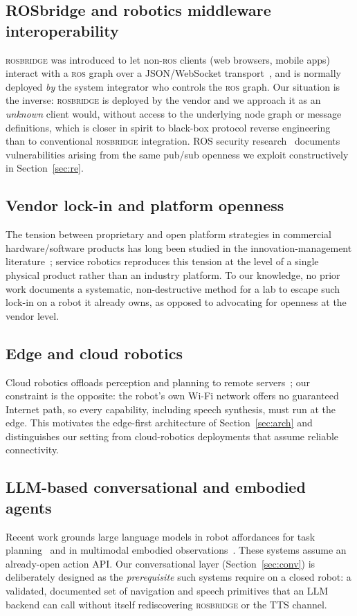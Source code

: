\documentclass[conference]{IEEEtran}
\newcommand{\ros}{\textsc{ros}}
\newcommand{\rosbridge}{\textsc{rosbridge}}
\begin{document}
\subsection{ROSbridge and robotics middleware interoperability}
\rosbridge{} was introduced to let non-\ros{} clients (web browsers, mobile apps) interact with a \ros{} graph over a JSON/WebSocket transport~\cite{crick2012rosbridge,rosbridge_suite}, and is normally deployed \emph{by} the system integrator who controls the \ros{} graph.
Our situation is the inverse: \rosbridge{} is deployed by the vendor and we approach it as an \emph{unknown} client would, without access to the underlying node graph or message definitions, which is closer in spirit to black-box protocol reverse engineering~\cite{comparetti2009prospex} than to conventional \rosbridge{} integration.
ROS security research~\cite{dieber2017security} documents vulnerabilities arising from the same pub/sub openness we exploit constructively in Section~\ref{sec:re}.

\subsection{Vendor lock-in and platform openness}
The tension between proprietary and open platform strategies in commercial hardware/software products has long been studied in the innovation-management literature~\cite{west2003open}; service robotics reproduces this tension at the level of a single physical product rather than an industry platform.
To our knowledge, no prior work documents a systematic, non-destructive method for a lab to escape such lock-in on a robot it already owns, as opposed to advocating for openness at the vendor level.

\subsection{Edge and cloud robotics}
Cloud robotics offloads perception and planning to remote servers~\cite{kehoe2015cloud}; our constraint is the opposite: the robot's own Wi-Fi network offers no guaranteed Internet path, so every capability, including speech synthesis, must run at the edge. This motivates the edge-first architecture of Section~\ref{sec:arch} and distinguishes our setting from cloud-robotics deployments that assume reliable connectivity.

\subsection{LLM-based conversational and embodied agents}
Recent work grounds large language models in robot affordances for task planning~\cite{ahn2022saycan} and in multimodal embodied observations~\cite{driess2023paleme}. 
These systems assume an already-open action API. 
Our conversational layer (Section~\ref{sec:conv}) is deliberately designed as the \emph{prerequisite} such systems require on a closed robot: a validated, documented set of navigation and speech primitives that an LLM backend can call without itself rediscovering \rosbridge{} or the TTS channel.
\end{document}
